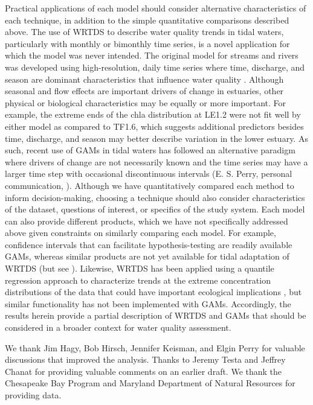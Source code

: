 \documentclass{svjour3}\usepackage[]{graphicx}\usepackage[]{color}
\begin{document}
Practical applications of each model should consider alternative characteristics of each technique, in addition to the simple quantitative comparisons described above.  The use of \ac{WRTDS} to describe water quality trends in tidal waters, particularly with monthly or bimonthly time series, is a novel application for which the model was never intended.  The original model for streams and rivers was developed using high-resolution, daily time series where time, discharge, and season are dominant characteristics that influence water quality \cite{Hirsch10}.  Although seasonal and flow effects are important drivers of change in estuaries, other physical or biological characteristics may be equally or more important.  For example, the extreme ends of the \ac{chla} distribution at LE1.2 were not fit well by either model as compared to TF1.6, which suggests additional predictors besides time, discharge, and season may better describe variation in the lower estuary.  As such, recent use of \acp{GAM} in tidal waters has followed an alternative paradigm where drivers of change are not necessarily known and the time series may have a larger time step with occasional discontinuous intervals (E. S. Perry, personal communication, \cite{Harding16}).  Although we have quantitatively compared each method to inform decision-making, choosing a technique should also consider characteristics of the dataset, questions of interest, or specifics of the study system.  Each model can also provide different products, which we have not specifically addressed above given constraints on similarly comparing each model.  For example, confidence intervals that can facilitate hypothesis-testing are readily available \acp{GAM}, whereas similar products are not yet available for tidal adaptation of \ac{WRTDS} (but see \cite{Hirsch15}).  Likewise, \ac{WRTDS} has been applied using a quantile regression approach to characterize trends at the extreme concentration distributions of the data that could have important ecological implications \cite{Beck15}, but similar functionality has not been implemented with \acp{GAM}.  Accordingly, the results herein provide a partial description of \ac{WRTDS} and \acp{GAM} that should be considered in a broader context for water quality assessment.

\begin{acknowledgements}
We thank Jim Hagy, Bob Hirsch, Jennifer Keisman, and Elgin Perry for valuable discussions that improved the analysis.  Thanks to Jeremy Testa and Jeffrey Chanat for providing valuable comments on an earlier draft.  We thank the Chesapeake Bay Program and Maryland Department of Natural Resources for providing data.
\end{acknowledgements}
\end{document}
